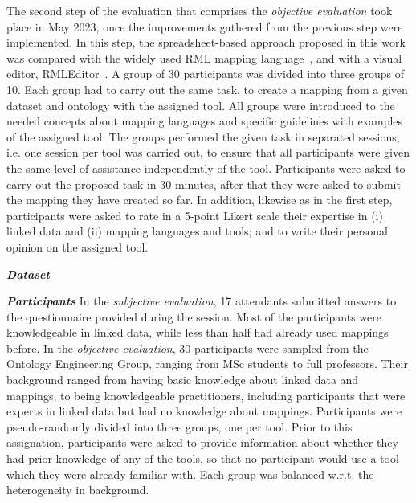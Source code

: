 The second step of the evaluation that comprises the \textit{objective evaluation} took place in May 2023, once the improvements gathered from the previous step were implemented. In this step, the spreadsheet-based approach proposed in this work was compared with the widely used RML mapping language~\cite{Dimou2014rml}, and with a visual editor, RMLEditor~\cite{heyvaert2016rmleditor}. A group of 30 participants was divided into three groups of 10. Each group had to carry out the same task, to create a mapping from a given dataset and ontology with the assigned tool. All groups were introduced to the needed concepts about mapping languages and specific guidelines with examples of the assigned tool. The groups performed the given task in separated sessions, i.e. one session per tool was carried out, to ensure that all participants were given the same level of assistance independently of the tool. Participants were asked to carry out the proposed task in 30 minutes, after that they were asked to submit the mapping they have created so far. In addition, likewise as in the first step, participants were asked to rate in a 5-point Likert scale their expertise in (i) linked data and (ii) mapping languages and tools; and to write their personal opinion on the assigned tool.



\noindent\textit{\textbf{Dataset}}

\noindent\textit{\textbf{Participants}} 
In the \textit{subjective evaluation}, 17 attendants submitted answers to the questionnaire provided during the session. Most of the participants were knowledgeable in linked data, while less than half had already used mappings before. 
In the \textit{objective evaluation}, 30 participants were sampled from the Ontology Engineering Group, ranging from MSc students to full professors. Their background ranged from having basic knowledge about linked data and mappings, to being knowledgeable practitioners, including participants that were experts in linked data but had no knowledge about mappings. Participants were pseudo-randomly divided into three groups, one per tool. Prior to this assignation, participants were asked to provide information about whether they had prior knowledge of any of the tools, so that no participant would use a tool which they were already familiar with. Each group was balanced w.r.t. the heterogeneity in background. 

